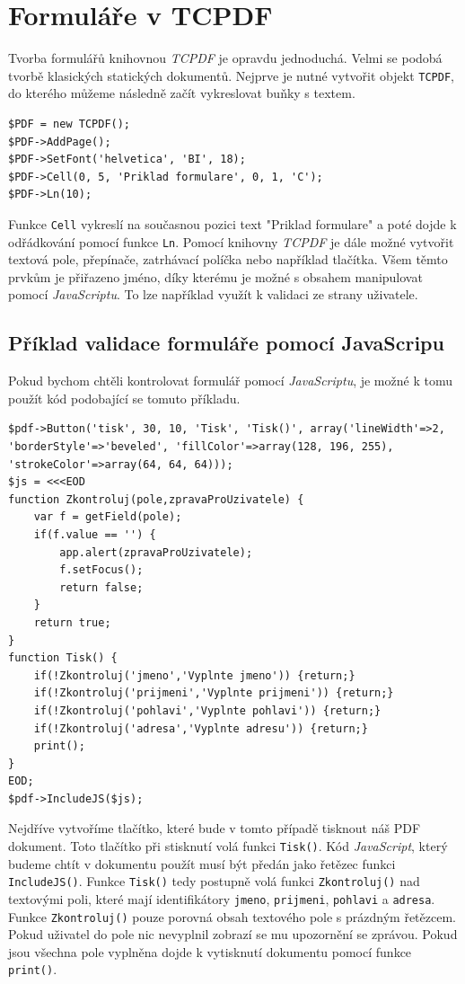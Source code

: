 \documentclass[czech,BP]{thesiskiv}
\begin{document}
\section{Formuláře v TCPDF}
Tvorba formulářů knihovnou \emph{TCPDF} je opravdu jednoduchá. Velmi se podobá tvorbě klasických statických dokumentů. Nejprve je nutné vytvořit objekt \texttt{TCPDF}, do kterého můžeme následně začít vykreslovat buňky s textem.
\begin{lstlisting}
$PDF = new TCPDF();
$PDF->AddPage();
$PDF->SetFont('helvetica', 'BI', 18);
$PDF->Cell(0, 5, 'Priklad formulare', 0, 1, 'C');
$PDF->Ln(10);
\end{lstlisting}
Funkce \texttt{Cell} vykreslí na současnou pozici text "Priklad formulare" a poté dojde k odřádkování pomocí funkce \texttt{Ln}. Pomocí knihovny \emph{TCPDF} je dále možné vytvořit textová pole, přepínače, zatrhávací políčka nebo například tlačítka. Všem těmto prvkům je přiřazeno jméno, díky kterému je možné s obsahem manipulovat pomocí \emph{JavaScriptu}. To lze například využít k validaci ze strany uživatele. 
\subsection{Příklad validace formuláře pomocí JavaScripu}
Pokud bychom chtěli kontrolovat formulář pomocí \emph{JavaScriptu}, je možné k tomu použít kód podobající se tomuto příkladu. 
\begin{lstlisting}
$pdf->Button('tisk', 30, 10, 'Tisk', 'Tisk()', array('lineWidth'=>2, 'borderStyle'=>'beveled', 'fillColor'=>array(128, 196, 255), 'strokeColor'=>array(64, 64, 64)));
$js = <<<EOD
function Zkontroluj(pole,zpravaProUzivatele) {
    var f = getField(pole);
    if(f.value == '') {
        app.alert(zpravaProUzivatele);
        f.setFocus();
        return false;
    }
    return true;
}
function Tisk() {
    if(!Zkontroluj('jmeno','Vyplnte jmeno')) {return;}
    if(!Zkontroluj('prijmeni','Vyplnte prijmeni')) {return;}
    if(!Zkontroluj('pohlavi','Vyplnte pohlavi')) {return;}
    if(!Zkontroluj('adresa','Vyplnte adresu')) {return;}
    print();
}
EOD;
$pdf->IncludeJS($js);
\end{lstlisting}
Nejdříve vytvoříme tlačítko, které bude v tomto případě tisknout náš PDF dokument. Toto tlačítko při stisknutí volá funkci \texttt{Tisk()}. Kód \emph{JavaScript}, který budeme chtít v dokumentu použít musí být předán jako řetězec funkci \texttt{IncludeJS()}. Funkce \texttt{Tisk()} tedy postupně volá funkci \texttt{Zkontroluj()} nad textovými poli, které mají identifikátory \texttt{jmeno}, \texttt{prijmeni}, \texttt{pohlavi} a \texttt{adresa}. Funkce \texttt{Zkontroluj()} pouze porovná obsah textového pole s prázdným řetězcem. Pokud uživatel do pole nic nevyplnil zobrazí se mu upozornění se zprávou. Pokud jsou všechna pole vyplněna dojde k vytisknutí dokumentu pomocí funkce \texttt{print()}.
\end{document}
